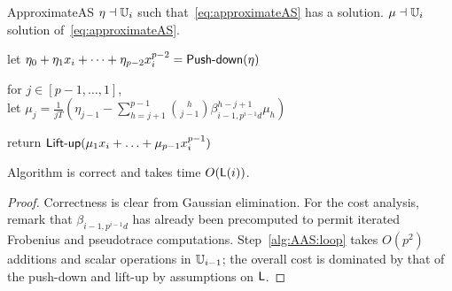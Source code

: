 \begin{algorithm}
  {ApproximateAS} 
  {$\eta\dashv\mathbb{U}_i$ such that~\eqref{eq:approximateAS} has a solution.}
  {$\mu\dashv\mathbb{U}_i$ solution of~\eqref{eq:approximateAS}.}
\item let $\eta_0 + \eta_1 x_i + \dots + \eta_{p-2} x_i^{p-2}=\text{{\sf Push-down}}(\eta)$
\item \label{alg:AAS:loop}for $j\in[p-1,\ldots,1]$,\\ let $\mu_j =
   \frac{1}{jT}\left(\eta_{j-1} -
  \sum_{h=j+1}^{p-1}\binom{h}{j-1}\beta_{i-1,p^{i-1}d}^{h-j+1}\mu_h\right)$
\item return $\text{{\sf Lift-up}}(\mu_1 x_i + \ldots + \mu_{p-1} x_i^{p-1})$
\end{algorithm}


\begin{theorem}
  \label{th:approximateAS}
  Algorithm  is correct and takes time $O(\mathsf{L}(i))$.
\end{theorem}

\begin{proof} Correctness is clear from Gaussian elimination.  For the cost
analysis, remark that $\beta_{i-1,p^{i-1}d}$ has already been
precomputed to permit iterated Frobenius and pseudotrace
computations. Step~\ref{alg:AAS:loop} takes $O(p^2)$ additions and
scalar operations in $\mathbb{U}_{i-1}$; the overall cost is dominated by that
of the push-down and lift-up by assumptions on $\mathsf{L}$. \end{proof}

